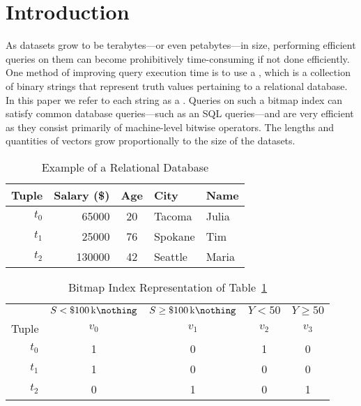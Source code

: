 \section{Introduction}
As datasets grow to be terabytes---or even petabytes---in size, performing
efficient queries on them can become prohibitively time-consuming if not done
efficiently. One method of improving query execution time is to use a
, which is a collection of binary strings that represent
truth values pertaining to a relational database. In this paper we refer
to each string as a . Queries on such a bitmap index can
satisfy common database queries---such as an SQL 
queries---and are very efficient as they consist primarily of machine-level
bitwise operators. The lengths and quantities of vectors grow proportionally to
the size of the datasets.
\par
%
\begin{table}
    \centering
    \begin{tabular}{@{}r|rcll@{}}
        \toprule
        Tuple   & Salary (\$)  & Age & City    & Name  \\
        \midrule
        \(t_0\) & \num{65000}  & 20  & Tacoma  & Julia \\
        \(t_1\) & \num{25000}  & 76  & Spokane & Tim   \\
        \(t_2\) & \num{130000} & 42  & Seattle & Maria \\
        \bottomrule
    \end{tabular}
    \caption{Example of a Relational Database}
    \label{table:census-relational}
\end{table}
%
\begin{table}
    \centering
    \begin{tabular}{@{}r||cc|cc@{}}
        \toprule
                & \(S < \SI{100}[\$]{\kilo\nothing}\) & \(S \geq \SI{100}[\$]{\kilo\nothing}\) & \(Y < 50\) & \(Y \geq 50\) \\
        Tuple   & \(v_0\)    & \(v_1\)       & \(v_2\)    & \(v_3\)       \\
        \midrule
        \(t_0\) & 1          & 0             & 1          & 0             \\
        \(t_1\) & 1          & 0             & 0          & 0             \\
        \(t_2\) & 0          & 1             & 0          & 1             \\
        \bottomrule
    \end{tabular}
    \caption{Bitmap Index Representation of Table~\ref{table:census-relational}}
    \label{table:census-bitmap}
\end{table}
